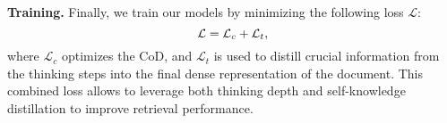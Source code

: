 \textbf{Training.}
Finally, we train our \method{} models by minimizing the following loss $\mathcal{L}$:
\begin{equation}\small
\mathcal{L} = \mathcal{L}_c + \mathcal{L}_t,
\end{equation}
where $\mathcal{L}_c$ optimizes the CoD, and $\mathcal{L}_t$ is used to distill crucial information from the thinking steps into the final dense representation of the document. This combined loss allows \method{} to leverage both thinking depth and self-knowledge distillation to improve retrieval performance.
